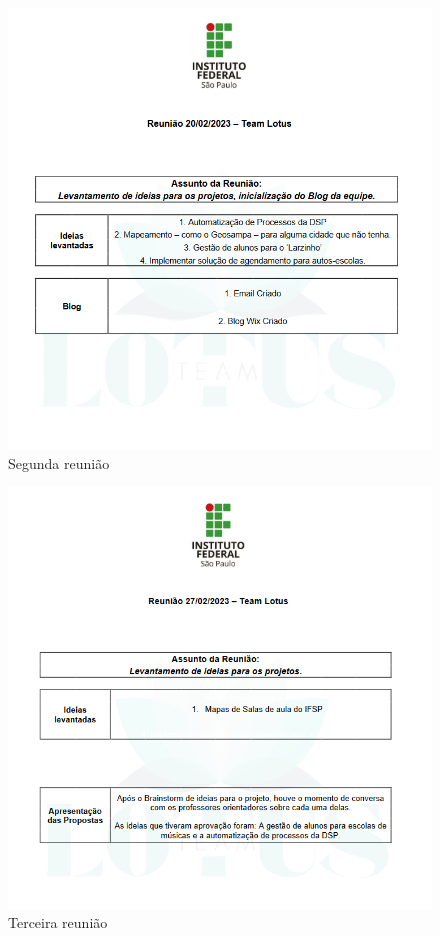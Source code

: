 \documentclass[12pt,a4paper]{article}
\begin{document}
\begin{figure}[H]
    \centering
     \includegraphics[width=15cm]{ilus2.png}
     \caption{Segunda reunião}
     \label{fig08}
\end{figure}

\begin{figure}[H]
    \centering
     \includegraphics[width=15cm]{ilus3.png}
     \caption{Terceira reunião}
     \label{fig09}
\end{figure}
\end{document}
